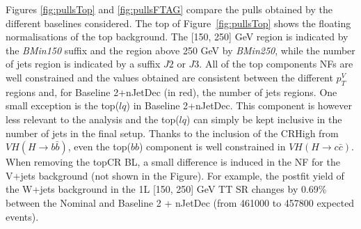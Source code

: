 Figures \ref{fig:pullsTop} and \ref{fig:pullsFTAG} compare the pulls obtained by the different baselines considered. The top of Figure~\ref{fig:pullsTop} shows the floating normalisations of the top background. The [150, 250] GeV region is indicated by the \textit{BMin150} suffix and the region above 250 GeV by \textit{BMin250}, while the number of jets region is indicated by a suffix $J2$ or $J3$. All of the top components NFs are well constrained and the values obtained are consistent between the different $p_T^V$ regions and, for Baseline 2+nJetDec (in red), the number of jets regions. One small exception is the top($lq$) in Baseline 2+nJetDec. This component is however less relevant to the analysis and the top($lq$) can simply be kept inclusive in the number of jets in the final setup. Thanks to the inclusion of the CRHigh from $VH(H\rightarrow b\bar{b})$, even the top($bb$) component is well constrained in $VH(H\rightarrow c\bar{c})$. When removing the topCR BL, a small difference is induced in the NF for the V+jets background (not shown in the Figure). For example, the postfit yield of the W+jets background in the 1L [150, 250] GeV TT SR changes by 0.69\% between the Nominal and Baseline 2 + nJetDec (from 461000 to 457800 expected events). \\

